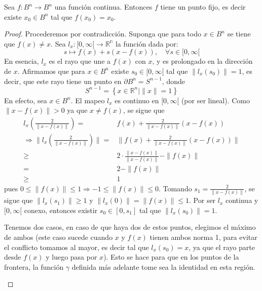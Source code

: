 \documentclass[12pt]{report}
\theoremstyle{largebreak}
\newcommand\cf[3]{\ensuremath{#1:#2\rightarrow#3}}
\begin{document}
\setcounter{section}{6}
\setcounter{theor}{12}

\begin{theor}
    Sea $\cf{f}{B^n}{B^n}$ una función continua. Entonces $f$ tiene un punto fijo, es decir existe $x_0\in B^n$ tal que $f(x_0)=x_0$.
\end{theor}

\begin{proof}
    Procederemos por contradicción. Suponga que para todo $x\in B^n$ se tiene que $f(x)\neq x$. Sea $\cf{l_x}{[0,\infty[}{\mathbb{R^n}}$ la función dada por:
    \begin{equation*}
        s\mapsto f(x)+s\left(x-f(x)\right),\quad \forall s\in[0,\infty[
    \end{equation*}
    En esencia, $l_x$ es el rayo que une a $f(x)$ con $x$, y es prolongado en la dirección de $x$. Afirmamos que para $x\in B^n$ existe $s_0\in[0,\infty[$ tal que $\|l_x(s_0)\|=1$, es decir, que este rayo tiene un punto en $\partial B^n=S^{n-1}$, donde
    \begin{equation*}
        S^{n-1}=\left\{x\in\mathbb{R}^n|\|x\|=1\right\}
    \end{equation*}
    En efecto, sea $x\in B^n$. El mapeo $l_x$ es continuo en $[0,\infty[$ (por ser lineal). Como $\|x-f(x)\|>0$ ya que $x\neq f(x)$, se sigue que
    \begin{equation*}
        \begin{split}
            l_x(\frac{2}{\|x-f(x)\|})=&f(x)+\frac{2}{\|x-f(x)\|}\left(x-f(x)\right)\\
            \Rightarrow \|l_x(\frac{2}{\|x-f(x)\|})\|=&\|f(x)+\frac{2}{\|x-f(x)\|}\left(x-f(x)\right)\|\\
            \geq& 2\cdot\frac{\|x-f(x)\|}{\|x-f(x)\|}-\|f(x)\|\\
            =&2-\|f(x)\|\\
            \geq&1
        \end{split}
    \end{equation*}
    pues $0\leq \|f(x)\|\leq 1 \Rightarrow -1\leq \|f(x)\|\leq 0$. Tomando $s_1=\frac{2}{\|x-f(x)\|}$, se sigue que $\|l_x(s_1)\|\geq 1$ y $\|l_x(0)\|=\|f(x)\|\leq 1$. Por ser $l_x$ continua y $[0,\infty[$ conexo, entonces existir $s_0\in[0,s_1]$ tal que $\|l_x(s_0)\|=1$.

    \begin{obs}
        Tenemos dos casos, en caso de que haya dos de estos puntos, elegimos el máximo de ambos (este caso sucede cuando $x$ y $f(x)$ tienen ambos norma 1, para evitar el conflicto tomamos al mayor, es decir tal que $l_x(s_0)=x$, ya que el rayo parte desde $f(x)$ y luego pasa por $x$). Esto se hace para que en los puntos de la frontera, la función $\gamma$ definida más adelante tome sea la identidad en esta región. 


\end{obs}
\end{proof}
\end{document}
